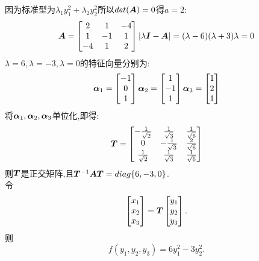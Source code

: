\documentclass[lang=cn,11pt,normal]{elegantbook}
\begin{document}
	\begin{solution}
		因为标准型为$\lambda_1y_1^2+\lambda_2y_2^2$所以$det(\AA)=0$得$a=2$:
		\begin{equation}
		\AA=
		\begin{bmatrix}
		2&1&-4\\
		1&-1&1\\
		-4&1&2
		\end{bmatrix}
		|\lambda\II-\AA|=(\lambda-6)(\lambda+3)\lambda=0
		\end{equation}
		$\lambda=6,\lambda=-3,\lambda=0$的特征向量分别为:
		\begin{equation}\bfaf_1=
		\begin{bmatrix}
		-1\\0\\1
		\end{bmatrix}
		\bfaf_2=
		\begin{bmatrix}
		1\\-1\\1
		\end{bmatrix}
		\bfaf_3=
		\begin{bmatrix}
		1\\2\\1
		\end{bmatrix}
		\end{equation}
		将$\bfaf_1,\bfaf_2,\bfaf_3$单位化,即得:
		\begin{equation}
		\TT=
		\begin{bmatrix}
		-\frac{1}{\sqrt{2}}&\frac{1}{\sqrt{3}}&\frac{1}{\sqrt{6}}\\
		0&-\frac{1}{\sqrt{3}}&\frac{2}{\sqrt{6}}\\
		\frac{1}{\sqrt{2}}&\frac{1}{\sqrt{3}}&\frac{1}{\sqrt{6}}
		\end{bmatrix}
		\end{equation}
		则$\TT$是正交矩阵,且$\TT^{-1}\AA\TT=diag\{6,-3,0\}$.\\
		令
		\begin{equation}
		\begin{bmatrix}
		x_1\\x_2\\x_3
		\end{bmatrix}
		=
		\TT
		\begin{bmatrix}
		y_1\\y_2\\y_3
		\end{bmatrix}.
		\end{equation}
		则\\
		\begin{equation}
		f(y_1,y_2,y_3)=6y_1^2-3y_2^2.
		\end{equation}
	\end{solution}
\end{document}
